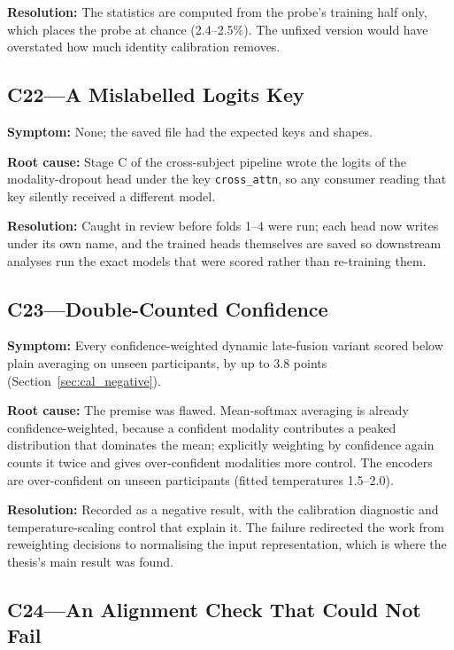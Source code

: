\textbf{Resolution:} The statistics are computed from the probe's training half only,
which places the probe at chance (2.4--2.5\%). The unfixed version would have overstated
how much identity calibration removes.

\subsection*{C22---A Mislabelled Logits Key}

\textbf{Symptom:} None; the saved file had the expected keys and shapes.

\textbf{Root cause:} Stage C of the cross-subject pipeline wrote the logits of the
modality-dropout head under the key \texttt{cross\_attn}, so any consumer reading that
key silently received a different model.

\textbf{Resolution:} Caught in review before folds 1--4 were run; each head now writes
under its own name, and the trained heads themselves are saved so downstream analyses
run the exact models that were scored rather than re-training them.

\subsection*{C23---Double-Counted Confidence}

\textbf{Symptom:} Every confidence-weighted dynamic late-fusion variant scored below
plain averaging on unseen participants, by up to 3.8 points
(Section~\ref{sec:cal_negative}).

\textbf{Root cause:} The premise was flawed. Mean-softmax averaging is already
confidence-weighted, because a confident modality contributes a peaked distribution that
dominates the mean; explicitly weighting by confidence again counts it twice and gives
over-confident modalities more control. The encoders are over-confident on unseen
participants (fitted temperatures 1.5--2.0).

\textbf{Resolution:} Recorded as a negative result, with the calibration diagnostic and
temperature-scaling control that explain it. The failure redirected the work from
reweighting decisions to normalising the input representation, which is where the
thesis's main result was found.

\subsection*{C24---An Alignment Check That Could Not Fail}

